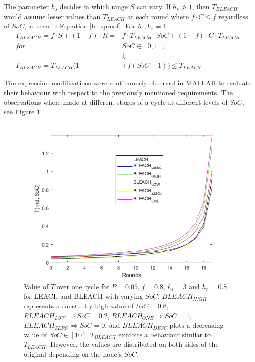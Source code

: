 \noindent The parameter $h_s$ decides in which range $S$ can vary. If $h_s\not> 1$, then $T_{BLEACH}$ would assume lesser values than $T_{LEACH}$ at each round where $f\cdot C \leq f$ regardless of $SoC$, as seen in Equation \ref{h_sproof}.\newline
For $h_s,h_r = 1$
\begin{align}
    \label{h_sproof}
    T_{BLEACH} = f\cdot S + (1-f)\cdot R = &f\cdot T_{LEACH}\cdot SoC + (1-f)\cdot C \cdot T_{LEACH} \\
    for\;&SoC\in[0,1], \nonumber \\
    &\Downarrow \nonumber \\
    T_{BLEACH} = T_{LEACH}(1&+f(SoC-1))\leq T_{LEACH} \nonumber
\end{align}

\noindent The expression modifications were continuously observed in MATLAB to evaluate their behaviour with respect to the previously mentioned requirements. The observations where made at different stages of a cycle at different levels of $SoC$, see Figure \ref{fig:B_LEACHplots}. 


\begin{figure}
    \centering
    \includegraphics[scale=0.9]{Images/B_LEACHallPlots.png}
    \caption{Value of $T$ over one cycle for $P=0.05$, $f=0.8$, $h_s=3$ and $h_r = 0.8$ for LEACH and BLEACH with varying $SoC$. $BLEACH_{HIGH}$ represents a constantly high value of $SoC = 0.8$, $BLEACH_{LOW} \Rightarrow SoC = 0.2$, $BLEACH_{ONE} \Rightarrow SoC=1$, $BLEACH_{ZERO} \Rightarrow SoC=0$, and $BLEACH_{DESC}$ plots a decreasing value of $SoC \in [1 0]$. $T_{BLEACH}$ exhibits a behaviour similar to $T_{LEACH}$. However, the values are distributed on both sides of the original depending on the node's $SoC$.}
    \label{fig:B_LEACHplots}
\end{figure}

